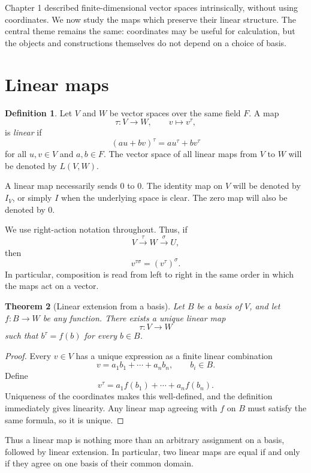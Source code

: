 \documentclass{amsbook}
\newtheorem{theorem}{Theorem}[chapter]
\theoremstyle{definition}
\newtheorem{definition}[theorem]{Definition}
\theoremstyle{remark}
\numberwithin{section}{chapter}
\numberwithin{equation}{chapter}
\begin{document}
Chapter 1 described finite-dimensional vector spaces intrinsically, without using coordinates. We now study the maps which preserve their linear structure. The central theme remains the same: coordinates may be useful for calculation, but the objects and constructions themselves do not depend on a choice of basis.

\section{Linear maps}

\begin{definition}
Let $V$ and $W$ be vector spaces over the same field $F$. A map
\[
\tau\colon V\longrightarrow W,
\qquad v\longmapsto v^\tau,
\]
is \emph{linear} if
\[
(au+bv)^\tau=au^\tau+bv^\tau
\]
for all $u,v\in V$ and $a,b\in F$. The vector space of all linear maps from $V$ to $W$ will be denoted by $L(V,W)$.
\end{definition}

A linear map necessarily sends $0$ to $0$. The identity map on $V$ will be denoted by $I_V$, or simply $I$ when the underlying space is clear. The zero map will also be denoted by $0$.

We use right-action notation throughout. Thus, if
\[
V\xrightarrow{\tau}W\xrightarrow{\sigma}U,
\]
then
\[
v^{\tau\sigma}=(v^\tau)^\sigma.
\]
In particular, composition is read from left to right in the same order in which the maps act on a vector.

\begin{theorem}[Linear extension from a basis]\label{thm:linear-extension}
Let $B$ be a basis of $V$, and let $f\colon B\to W$ be any function. There exists a unique linear map
\[
\tau\colon V\to W
\]
such that $b^\tau=f(b)$ for every $b\in B$.
\end{theorem}

\begin{proof}
Every $v\in V$ has a unique expression as a finite linear combination
\[
v=a_1b_1+\cdots+a_nb_n,
\qquad b_i\in B.
\]
Define
\[
v^\tau=a_1f(b_1)+\cdots+a_nf(b_n).
\]
Uniqueness of the coordinates makes this well-defined, and the definition immediately gives linearity. Any linear map agreeing with $f$ on $B$ must satisfy the same formula, so it is unique.
\end{proof}

Thus a linear map is nothing more than an arbitrary assignment on a basis, followed by linear extension. In particular, two linear maps are equal if and only if they agree on one basis of their common domain.
\end{document}

